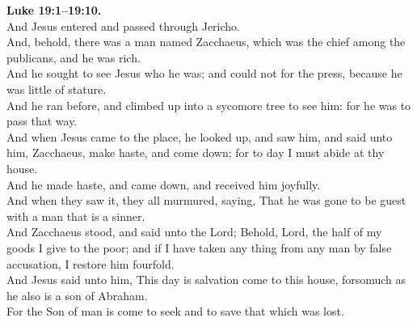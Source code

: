 \documentclass[12pt]{article} %
\begin{document}
{\begin{minipage}[t]{0.45\textwidth}
\textbf{Luke 19:1--19:10.}\\
And Jesus entered and passed through Jericho.\\
And, behold, there was a man named Zacchaeus, which was the chief among the publicans, and he was rich.\\
And he sought to see Jesus who he was; and could not for the press, because he was little of stature.\\
And he ran before, and climbed up into a sycomore tree to see him: for he was to pass that way.\\
And when Jesus came to the place, he looked up, and saw him, and said unto him, Zacchaeus, make haste, and come down; for to day I must abide at thy house.\\
And he made haste, and came down, and received him joyfully.\\
And when they saw it, they all murmured, saying, That he was gone to be guest with a man that is a sinner.\\
And Zacchaeus stood, and said unto the Lord; Behold, Lord, the half of my goods I give to the poor; and if I have taken any thing from any man by false accusation, I restore him fourfold.\\
And Jesus said unto him, This day is salvation come to this house, forsomuch as he also is a son of Abraham.\\
For the Son of man is come to seek and to save that which was lost.\\

\end{minipage}}
\vspace*{\fill}
\newpage
\huge%
\vspace*{\fill}
\begin{spacing}{1.2}
\end{spacing}
\vspace*{\fill}
\end{document}

